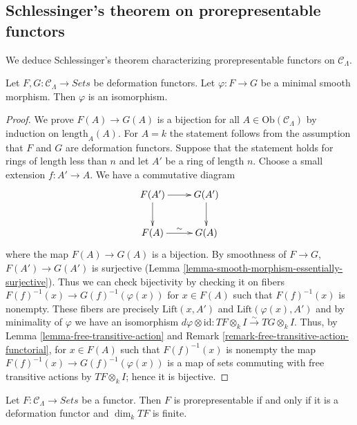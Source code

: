 \subsection{Schlessinger's theorem on prorepresentable functors}
\label{subsection-schlessingers-theorem}

\noindent
We deduce Schlessinger's theorem characterizing prorepresentable functors on 
$\mathcal{C}_\Lambda$.

\begin{lemma}
\label{lemma-minimal-smooth-morphism-functors}
Let $F,G: \mathcal{C}_\Lambda \to \textit{Sets}$ be deformation 
functors.  Let $\varphi: F \to G$ be a minimal smooth morphism. Then 
$\varphi$ is an isomorphism.
\end{lemma}

\begin{proof}
We prove $F(A) \to G(A)$ is a bijection for all $A \in 
\text{Ob}(\mathcal{C}_\Lambda)$ by induction on 
$\text{length}_{A}(A)$.  For $A = k$ the statement follows from the 
assumption that $F$ and $G$ are deformation functors. Suppose that the 
statement holds for rings of length less than $n$ and let $A'$ be a ring of 
length $n$. Choose a small extension $f: A' \to A$.  We have a 
commutative diagram
\[
\xymatrix{
F(A') \ar[r] \ar[d] & G(A') \ar[d] \\
F(A) \ar[r]^{\sim} & G(A)
}
\]
where the map $F(A) \to G(A)$ is a bijection.  By smoothness of $F 
\to G$, $F(A') \to G(A')$ is surjective (Lemma 
\ref{lemma-smooth-morphism-essentially-surjective}).  Thus we can check 
bijectivity by checking it on fibers $F(f)^{-1}(x) \to 
G(f)^{-1}(\varphi(x))$ for $x \in F(A)$ such that $F(f)^{-1}(x)$ is nonempty.  
These fibers are precisely $\text{Lift}(x,A')$ and 
$\text{Lift}(\varphi(x),A')$ and by minimality of $\varphi$ we have an 
isomorphism $d\varphi \otimes \text{id}: TF \otimes_{k} I 
\xrightarrow{\sim} TG \otimes_{k} I$.  Thus, by Lemma 
\ref{lemma-free-transitive-action} and Remark 
\ref{remark-free-transitive-action-functorial}, for $x \in F(A)$ such that 
$F(f)^{-1}(x)$ is nonempty the map $F(f)^{-1}(x) \to 
G(f)^{-1}(\varphi(x))$ is a map of sets commuting with free transitive actions 
by $TF \otimes_{k} I$; hence it is bijective.
\end{proof}

\begin{theorem}
\label{lemma-Schlessinger-prorepresentability}
Let $F: \mathcal{C}_\Lambda \to \textit{Sets}$ be a functor.  
Then $F$ is prorepresentable if and only if it is a deformation functor and 
$\dim_k TF$ is finite.
\end{theorem}

